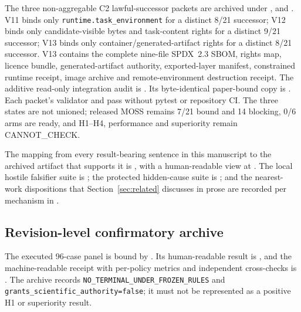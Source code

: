The three non-aggregable C2 lawful-successor packets are archived under
,
 and
. V11
binds only \texttt{runtime.task\_environment} for a distinct 8/21 successor;
V12 binds only candidate-visible bytes and task-content rights for a distinct
9/21 successor; V13 binds only container/generated-artifact rights for a
distinct 8/21 successor. V13 contains the complete nine-file SPDX~2.3 SBOM,
rights map, licence bundle, generated-artifact authority, exported-layer
manifest, constrained runtime receipt, image archive and remote-environment
destruction receipt. The additive read-only integration audit is
.
Its byte-identical paper-bound copy is
.
Each packet's validator and  pass without pytest or repository
CI. The three states are not unioned; released MOSS remains 7/21 bound and 14
blocking, 0/6 arms are ready, and H1--H4, performance and superiority remain
\textsf{CANNOT\_CHECK}.

The mapping from every result-bearing sentence in this manuscript to the archived artifact that supports it is , with a human-readable view at . The local hostile falsifier suite is ; the protected hidden-cause suite is ; and the nearest-work dispositions that Section~\ref{sec:related} discusses in prose are recorded per mechanism in .

\subsection*{Revision-level confirmatory archive}

The executed 96-case panel is bound by
. Its
human-readable result is
,
and the machine-readable receipt with per-policy metrics and independent
cross-checks is
.
The archive records \texttt{NO\_TERMINAL\_UNDER\_FROZEN\_RULES} and
\texttt{grants\_scientific\_authority=false}; it must not be represented as a
positive H1 or superiority result.

